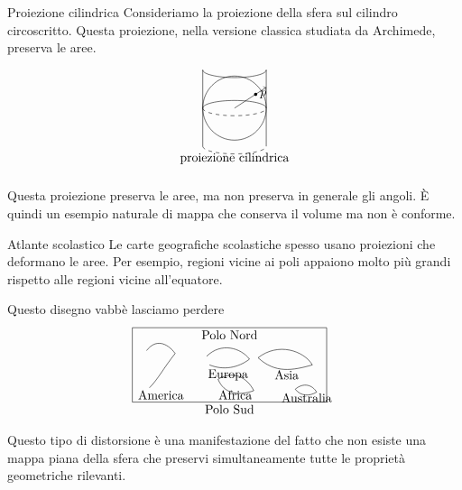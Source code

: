 \documentclass[a4paper]{article}
\begin{document}
\begin{snippetexample}{Proiezione cilindrica}
Consideriamo la proiezione della sfera sul cilindro circoscritto. Questa proiezione, nella versione classica studiata da Archimede, preserva le aree.

\[
    \begin{tikzpicture}[scale=0.85]
        \draw (0,0) circle (1.05);
        \draw[dashed] (-1.05,0) arc (180:360:1.05 and 0.25);
        \draw (1.05,0) arc (0:180:1.05 and 0.25);
        \draw (-1.05,-1.25) -- (-1.05,1.25);
        \draw (1.05,-1.25) -- (1.05,1.25);
        \draw (-1.05,1.25) arc (180:360:1.05 and 0.25);
        \draw[dashed] (-1.05,-1.25) arc (180:360:1.05 and 0.25);
        \fill (0.7,0.45) circle (1.5pt) node[right] {\(p\)};
        \draw[->] (0,0) -- (1.05,0.68);
        \node at (0,-1.65) {proiezione cilindrica};
    \end{tikzpicture}
\]

Questa proiezione preserva le aree, ma non preserva in generale gli angoli. È quindi un esempio naturale di mappa che conserva il volume ma non è conforme.
\end{snippetexample}

\begin{snippetexample}{Atlante scolastico}
Le carte geografiche scolastiche spesso usano proiezioni che deformano le aree. Per esempio, regioni vicine ai poli appaiono molto più grandi rispetto alle regioni vicine all'equatore.

Questo disegno vabbè lasciamo perdere
\[
    \begin{tikzpicture}[scale=0.8]
        \draw (0,0) rectangle (6.8,2.6);
        \draw (0.5,1.8) .. controls (0.8,2.2) and (1.2,2.1) .. (1.5,1.7)
            .. controls (1.1,1.2) and (0.9,0.8) .. (0.6,0.5);
        \node at (1.0,0.25) {America};
        \draw (2.6,1.6) .. controls (3.1,2.1) and (3.8,1.9) .. (4.1,1.5)
            .. controls (3.7,1.2) and (3.2,1.1) .. (2.7,1.3);
        \node at (3.35,0.95) {Europa};
        \draw (3.0,0.8) .. controls (3.5,1.1) and (4.0,0.9) .. (4.25,0.4)
            .. controls (3.7,0.2) and (3.2,0.3) .. (3.0,0.8);
        \node at (3.6,0.25) {Africa};
        \draw (4.4,1.55) .. controls (5.1,2.1) and (6.0,1.8) .. (6.3,1.3)
            .. controls (5.6,1.1) and (5.0,1.0) .. (4.4,1.55);
        \node at (5.4,0.95) {Asia};
        \draw (5.7,0.45) .. controls (6.0,0.7) and (6.3,0.6) .. (6.45,0.35)
            .. controls (6.2,0.2) and (5.9,0.2) .. (5.7,0.45);
        \node at (6.1,0.15) {Australia};
        \node at (3.4,2.35) {Polo Nord};
        \node at (3.4,-0.25) {Polo Sud};
    \end{tikzpicture}
\]
Questo tipo di distorsione è una manifestazione del fatto che non esiste una mappa piana della sfera che preservi simultaneamente tutte le proprietà geometriche rilevanti.
\end{snippetexample}
\end{document}
